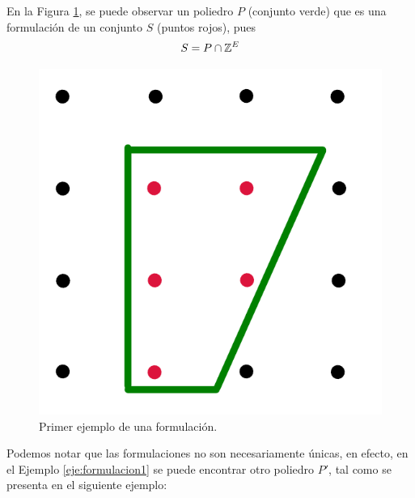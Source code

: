 \begin{eje} \label{eje:formulacion1}
En la Figura \ref{fig:formulacion1}, se puede observar un poliedro $P$ (conjunto verde) que es una formulación de un conjunto $S$ (puntos rojos), pues $$S = P \cap \mathbb Z^{E}$$ 
\begin{figure}[H] 
    \centering
    \includegraphics[scale=0.3]{formulacion1.png}
    \caption{Primer ejemplo de una formulación.}
    \label{fig:formulacion1}
\end{figure}
\end{eje}

Podemos notar que las formulaciones no son necesariamente únicas, en efecto, en el Ejemplo \ref{eje:formulacion1} se puede encontrar otro poliedro $P'$, tal como se presenta en el siguiente ejemplo:

